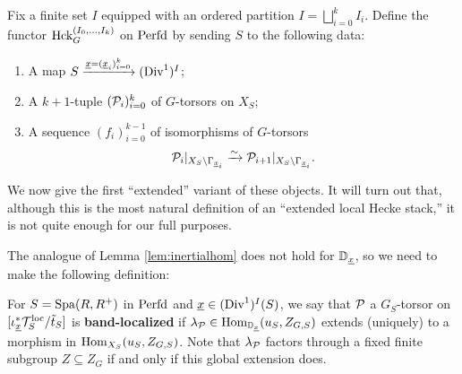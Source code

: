 \begin{defi}
Fix a finite set $I$ equipped with an ordered partition $I = \bigsqcup_{i=0}^{k} I_{i}$.
Define the functor $\textnormal{Hck}_{G}^{(I_{0}, \dots, I_{k})}$ on $\mathrm{Perfd}$ by sending $S$ to the following data:
\begin{enumerate}
\item{A map $S \xrightarrow{\underline{x} = (\underline{x}_{i})_{i=0}^{k}}(\mathrm{Div}^{1})^{I}$;}
\item{A $k+1$-tuple $(\mathcal{P}_{i})_{i=0}^{k}$ of $G$-torsors on $X_{S}$;}
\item{A sequence $(f_{i})_{i=0}^{k-1}$ of isomorphisms of $G$-torsors
\begin{equation*}
    \mathcal{P}_{i}|_{X_{S} \setminus \Gamma_{\underline{x}_{i}}} \xrightarrow{\sim} \mathcal{P}_{i+1}|_{X_{S} \setminus \Gamma_{\underline{x}_{i}}}.
\end{equation*}
}
\end{enumerate}
\end{defi}

We now give the first ``extended'' variant of these objects. It will turn out that, although this is the most natural definition of an ``extended local Hecke stack,'' it is not quite enough for our full purposes.

The analogue of Lemma \ref{lem:inertialhom} does not hold for $\mathbb D_{\underline{x}}$, so we need to make the following definition:


\begin{defi}\label{defi:bandloc}
    For $S = \mathrm{Spa}(R,R^{+})$ in $\mathrm{Perfd}$ and $\underline{x} \in (\mathrm{Div}^{1})^{I}(S)$, we say that $\mathcal{P}$ a $G_{S}$-torsor on $[\iota_{\underline{x}}^{*}\mathcal{T}_{S}^{\mathrm{loc}}/\tilde{t}_{S}]$ is \textbf{band-localized} if $\lambda_{\mathcal{P}} \in \mathrm{Hom}_{\mathbb D_{\underline{x}}}(u_{S}, Z_{G,S})$ extends (uniquely) to a morphism in $\mathrm{Hom}_{X_{S}}(u_{S}, Z_{G,S})$. Note that $\lambda_{\mathcal{P}}$ factors through a fixed finite subgroup $Z \subseteq Z_{G}$ if and only if this global extension does.
\end{defi}

